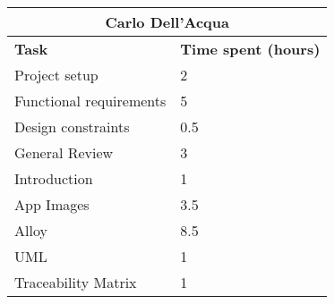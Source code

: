 \begin{table}[h]
  \centering
  \begin{tabular}{l|l}
    \multicolumn{2}{c}{\textbf{Carlo Dell'Acqua}} \\
    \hline
    \textbf{Task} & \textbf{Time spent (hours)}\\
    \hline
    Project setup & 2 \\
    Functional requirements & 5 \\
    Design constraints & 0.5 \\
    General Review & 3 \\
    Introduction & 1 \\
    App Images & 3.5 \\
    Alloy & 8.5 \\
    UML & 1 \\
    Traceability Matrix & 1 \\
  \end{tabular}
\end{table}